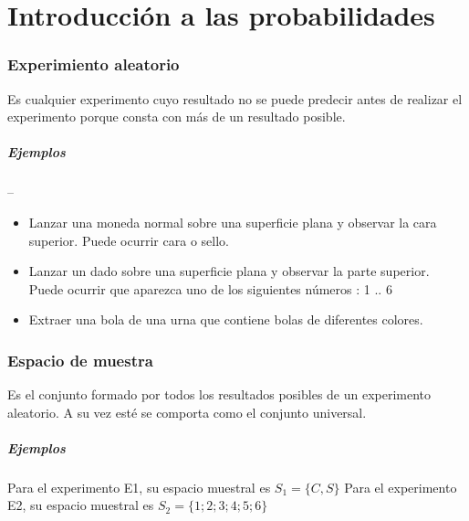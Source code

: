 
\section*{Introducción a las probabilidades }

\subsubsection*{Experimiento aleatorio}
Es cualquier experimento cuyo resultado no se puede predecir antes de realizar el experimento porque consta con más de un resultado posible.

\subparagraph*{Ejemplos} -- 
\begin{itemize}
\item{Lanzar una moneda normal sobre una superficie plana y observar la cara superior. Puede ocurrir cara o sello.}
\item{Lanzar un dado sobre una superficie plana y observar la parte superior. Puede ocurrir que aparezca uno de los siguientes números : 1 .. 6}
\item{Extraer una bola de una urna que contiene bolas de diferentes colores.}
\end{itemize}

\subsubsection*{Espacio de muestra}
Es el conjunto formado por todos los resultados posibles de un experimento aleatorio. A su vez esté se comporta como el conjunto universal.

\subparagraph*{Ejemplos} 
Para el experimento E1, su espacio muestral es $S_1 = \{C, S\}$
Para el experimento E2, su espacio muestral  es $S_2 = \{1; 2 ; 3; 4;5 ;6 \}$



